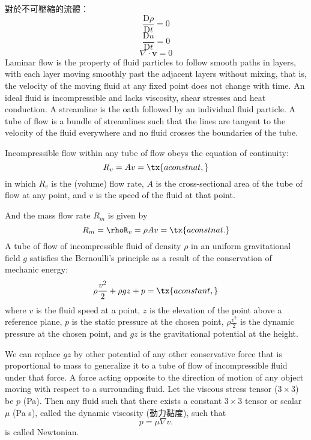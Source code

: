 \documentclass[a4paper,12pt]{article}
\begin{document}
對於不可壓縮的流體：
\[\frac{\mathrm{D}\rho}{\mathrm{D}t}=0\]
\[\frac{\mathrm{D}u}{\mathrm{D}t}=0\]
\[\nabla\cdot\mathbf{v}=0\]
Laminar flow is the property of fluid particles to follow smooth paths in layers, with each layer moving smoothly past the adjacent layers without mixing, that is, the velocity of the moving fluid at any fixed point does not change with time.
An ideal fluid is incompressible and lacks viscosity, shear stresses and heat conduction.
A streamline is the oath followed by an individual fluid particle.
A tube of flow is a bundle of streamlines such that the lines are tangent to the velocity of the fluid everywhere and no fluid crosses the boundaries of the tube.

Incompressible flow within any tube of flow obeys the equation of continuity:
\[R_v=Av=\tx{a constnat,}\]
in which $R_v$ is the (volume) flow rate, $A$ is the cross-sectional area of the tube of flow at any point, and $v$ is the speed of the fluid at that point.

And the mass flow rate $R_m$ is given by
\[R_m=\rhoR_v=\rho Av=\tx{a constnat.}\]
A tube of flow of incompressible fluid of density $\rho$ in an uniform gravitational field $g$ satisfies the Bernoulli's principle as a result of the conservation of mechanic energy:
\[\rho\frac{v^2}{2}+\rho gz+p=\tx{a constant,}\]
where $v$ is the fluid speed at a point, $z$ is the elevation of the point above a reference plane, $p$ is the static pressure at the chosen point, $\rho\frac{v^2}{2}$ is the dynamic pressure at the chosen point, and $gz$ is the gravitational potential at the height.

We can replace $gz$ by other potential of any other conservative force that is proportional to mass to generalize it to a tube of flow of incompressible fluid under that force.
A force acting opposite to the direction of motion of any object moving with respect to a surrounding fluid.
Let the viscous stress tensor ($3\times 3$) be $p$ (Pa). Then any fluid such that there exists a constant $3\times 3$ tensor or scalar $\mu$ (Pa s), called the dynamic viscosity (動力黏度), such that
\[p=\mu\nabla v.\]
is called Newtonian.
\end{document}

